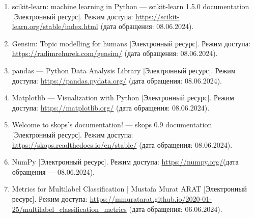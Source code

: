 \documentclass[a4paper, 12pt]{article}
\begin{document}
\begin{large}
\begin{enumerate}
    \item scikit-learn: machine learning in Python --- scikit-learn 1.5.0 documentation [Электронный ресурс]. Режим доступа: \url{https://scikit-learn.org/stable/index.html} (дата обращения: 08.06.2024).
    \item Gensim: Topic modelling for humans [Электронный ресурс]. Режим доступа: \url{https://radimrehurek.com/gensim/} (дата обращения: 08.06.2024).
    \item pandas --- Python Data Analysis Library [Электронный ресурс]. Режим доступа: \url{https://pandas.pydata.org/} (дата обращения: 08.06.2024).
    \item Matplotlib --- Visualization with Python [Электронный ресурс]. Режим доступа: \url{https://matplotlib.org/} (дата обращения: 08.06.2024).
    \item Welcome to skops's documentation! --- skops 0.9 documentation [Электронный ресурс]. Режим доступа: \url{https://skops.readthedocs.io/en/stable/} (дата обращения: 08.06.2024).
    \item NumPy [Электронный ресурс]. Режим доступа: \url{https://numpy.org/}(дата обращения --- 08.06.2024).
    \item Metrics for Multilabel Classification | Mustafa Murat ARAT [Электронный ресурс]. Режим доступа: \url{https://mmuratarat.github.io/2020-01-25/multilabel_classification_metrics} (дата обращения: 06.06.2024).
\end{enumerate}

\end{large}
\end{document}
